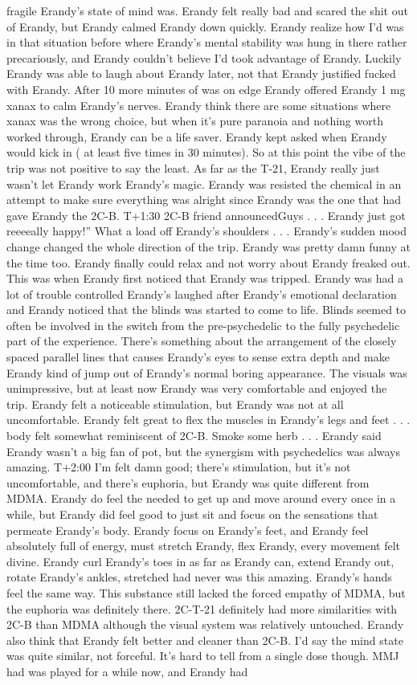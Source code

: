 \documentclass[12pt]{book}
\begin{document}
fragile Erandy's state of mind was. Erandy felt really bad and scared the shit out of Erandy, but Erandy calmed Erandy down quickly. Erandy realize how I'd was in that situation before where Erandy's mental stability was hung in there rather precariously, and Erandy couldn't believe I'd took advantage of Erandy. Luckily Erandy was able to laugh about Erandy later, not that Erandy justified fucked with Erandy. After 10 more minutes of was on edge Erandy offered Erandy 1 mg xanax to calm Erandy's nerves. Erandy think there are some situations where xanax was the wrong choice, but when it's pure paranoia and nothing worth worked through, Erandy can be a life saver. Erandy kept asked when Erandy would kick in ( at least five times in 30 minutes). So at this point the vibe of the trip was not positive to say the least. As far as the T-21, Erandy really just wasn't let Erandy work Erandy's magic. Erandy was resisted the chemical in an attempt to make sure everything was alright since Erandy was the one that had gave Erandy the 2C-B. T+1:30 2C-B friend announcedGuys  . . .  Erandy just got reeeeally happy!'' What a load off Erandy's shoulders  . . .  Erandy's sudden mood change changed the whole direction of the trip. Erandy was pretty damn funny at the time too. Erandy finally could relax and not worry about Erandy freaked out. This was when Erandy first noticed that Erandy was tripped. Erandy was had a lot of trouble controlled Erandy's laughed after Erandy's emotional declaration and Erandy noticed that the blinds was started to come to life. Blinds seemed to often be involved in the switch from the pre-psychedelic to the fully psychedelic part of the experience. There's something about the arrangement of the closely spaced parallel lines that causes Erandy's eyes to sense extra depth and make Erandy kind of jump out of Erandy's normal boring appearance. The visuals was unimpressive, but at least now Erandy was very comfortable and enjoyed the trip. Erandy felt a noticeable stimulation, but Erandy was not at all uncomfortable. Erandy felt great to flex the muscles in Erandy's legs and feet  . . .  body felt somewhat reminiscent of 2C-B. Smoke some herb  . . .  Erandy said Erandy wasn't a big fan of pot, but the synergism with psychedelics was always amazing. T+2:00 I'm felt damn good; there's stimulation, but it's not uncomfortable, and there's euphoria, but Erandy was quite different from MDMA. Erandy do feel the needed to get up and move around every once in a while, but Erandy did feel good to just sit and focus on the sensations that permeate Erandy's body. Erandy focus on Erandy's feet, and Erandy feel absolutely full of energy, must stretch Erandy, flex Erandy, every movement felt divine. Erandy curl Erandy's toes in as far as Erandy can, extend Erandy out, rotate Erandy's ankles, stretched had never was this amazing. Erandy's hands feel the same way. This substance still lacked the forced empathy of MDMA, but the euphoria was definitely there. 2C-T-21 definitely had more similarities with 2C-B than MDMA although the visual system was relatively untouched. Erandy also think that Erandy felt better and cleaner than 2C-B. I'd say the mind state was quite similar, not forceful. It's hard to tell from a single dose though. MMJ had was played for a while now, and Erandy had 
\end{document}
